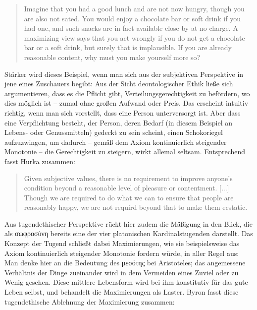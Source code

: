 \documentclass[a4paper]{thesis}
\begin{document}
\begin{quote}
Imagine that you had a good lunch and are not now hungry, though you are also not sated. You would enjoy a chocolate bar or soft drink if you had one, and such snacks are in fact available close by at no charge. A maximizing view says that you act wrongly if you do not get a chocolate bar or a soft drink, but surely that is implausible. If you are already reasonable content, why must you make yourself more so?
\end{quote}

Stärker wird dieses Beispiel, wenn man sich aus der subjektiven Perspektive in jene eines Zuschauers begibt: Aus der Sicht deontologischer Ethik ließe sich argumentieren, dass es die Pflicht gibt, Verteilungsgerechtigkeit zu befördern, wo dies möglich ist -- zumal ohne großen Aufwand oder Preis. Das erscheint intuitiv richtig, wenn man sich vorstellt, dass eine Person unterversorgt ist. Aber dass eine Verpflichtung besteht, der Person, deren Bedarf (in diesem Beispiel an Lebens- oder Genussmitteln) gedeckt zu sein scheint, einen Schokoriegel aufzuzwingen, um dadurch -- gemäß dem Axiom kontinuierlich steigender Monotonie -- die Gerechtigkeit zu steigern, wirkt allemal seltsam. Entsprechend fasst Hurka zusammen: 

\begin{quote}
Given subjective values, there is no requirement to improve anyone's condition beyond a reasonable level of pleasure or contentment. [...] Though we are required to do what we can to ensure that people are reasonably happy, we are not requird beyond that to make them ecstatic.
\end{quote}

Aus tugendethischer Perspektive rückt hier zudem die Mäßigung in den Blick, die als \textgreek{σωφροσύνη} bereits eine der vier platonischen Kardinalstugenden darstellt. Das Konzept der Tugend schließt dabei Maximierungen, wie sie beispielsweise das Axiom kontinuierlich steigender Monotonie fordern würde, in aller Regel aus: Man denke hier an die Bedeutung des \textgreek{μεσότης} bei Aristoteles; das angemessene Verhältnis der Dinge zueinander wird in dem Vermeiden eines Zuviel oder zu Wenig gesehen. Diese mittlere Lebensform wird bei ihm konstitutiv für das gute Leben selbst, und behandelt die Maximierungen als Laster. Byron fasst diese tugendethische Ablehnung der Maximierung zusammen:
\end{document}
